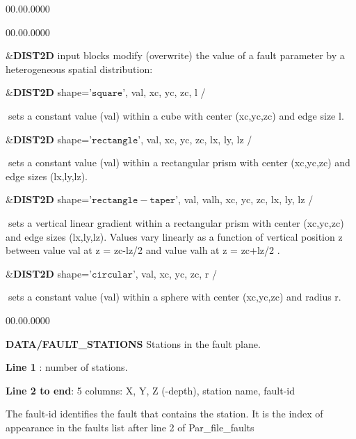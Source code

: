 \begin{lyxlist}{00.00.0000}
\begin{lyxlist}{00.00.0000}
\item [{\&\textbf{DIST2D}}] input blocks modify (overwrite) the value of
a fault parameter by a heterogeneous spatial distribution:


\&\textbf{DIST2D} shape='$\mathtt{square}$', val, xc, yc, zc, l /


$\;$sets a constant value (val) within a cube with center (xc,yc,zc)
and edge size l.


\&\textbf{DIST2D} shape='$\mathtt{rectangle}$', val, xc, yc, zc,
lx, ly, lz /


$\;$sets a constant value (val) within a rectangular prism with center
(xc,yc,zc) and edge sizes (lx,ly,lz).


\&\textbf{DIST2D} shape='$\mathtt{rectangle-taper}$', val, valh,
xc, yc, zc, lx, ly, lz /


$\;$sets a vertical linear gradient within a rectangular prism with
center (xc,yc,zc) and edge sizes (lx,ly,lz). Values vary linearly
as a function of vertical position z between value val at z = zc-lz/2
and value valh at z = zc+lz/2 .


\&\textbf{DIST2D} shape='$\mathtt{circular}$', val, xc, yc, zc, r
/


$\;$sets a constant value (val) within a sphere with center (xc,yc,zc)
and radius r. \\


\end{lyxlist}
\end{lyxlist}

\begin{lyxlist}{00.00.0000}
\item [{\textbf{DATA/FAULT\_STATIONS}}] Stations in the fault plane.


\textbf{Line 1} : number of stations.


\textbf{Line 2 to end}: 5 columns: X, Y, Z (-depth), station name,
fault-id


The fault-id identifies the fault that contains the station. It is
the index of appearance in the faults list after line 2 of Par\_file\_faults

\end{lyxlist}


